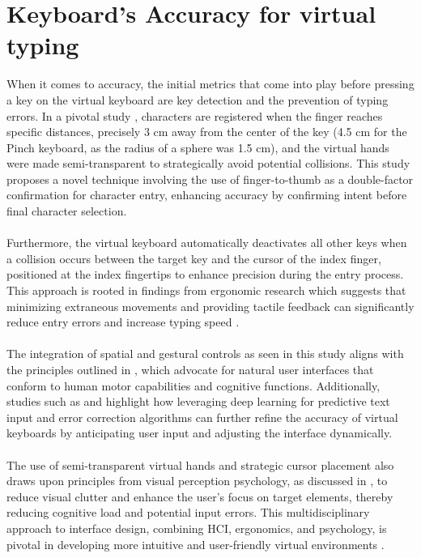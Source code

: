 \section{Keyboard’s Accuracy for virtual typing}
\label{sec: Keyboard’s Accuracy for virtual typing}
When it comes to accuracy, the initial metrics that come into play before pressing a key on the virtual keyboard are key detection and the prevention of typing errors. In a pivotal study \cite{pseudoHaptics2022}, characters are registered when the finger reaches specific distances, precisely 3 cm away from the center of the key (4.5 cm for the Pinch keyboard, as the radius of a sphere was 1.5 cm), and the virtual hands were made semi-transparent to strategically avoid potential collisions. This study proposes a novel technique involving the use of finger-to-thumb as a double-factor confirmation for character entry, enhancing accuracy by confirming intent before final character selection.  \\ \\
Furthermore, the virtual keyboard automatically deactivates all other keys when a collision occurs between the target key and the cursor of the index finger, positioned at the index fingertips to enhance precision during the entry process. This approach is rooted in findings from ergonomic research which suggests that minimizing extraneous movements and providing tactile feedback can significantly reduce entry errors and increase typing speed \cite{mcneill2009gesture, wigdor2011brave}. \\ \\
The integration of spatial and gestural controls as seen in this study aligns with the principles outlined in \cite{norman2013design}, which advocate for natural user interfaces that conform to human motor capabilities and cognitive functions. Additionally, studies such as \cite{zhang2017deep} and \cite{baljko2006automatic} highlight how leveraging deep learning for predictive text input and error correction algorithms can further refine the accuracy of virtual keyboards by anticipating user input and adjusting the interface dynamically. \\ \\
The use of semi-transparent virtual hands and strategic cursor placement also draws upon principles from visual perception psychology, as discussed in \cite{ware2012information}, to reduce visual clutter and enhance the user's focus on target elements, thereby reducing cognitive load and potential input errors. This multidisciplinary approach to interface design, combining HCI, ergonomics, and psychology, is pivotal in developing more intuitive and user-friendly virtual environments \cite{jacko2009human, charness2005aging}.

